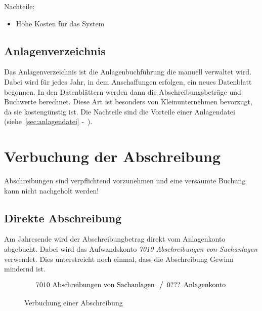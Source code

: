 \documentclass[a4paper,10pt]{report}
\begin{document}
Nachteile:
\begin{itemize}
  \item Hohe Kosten für das System
\end{itemize}

\section{Anlagenverzeichnis}
\label{sec:anlagenverzeichnis}
Das Anlagenverzeichnis ist die Anlagenbuchführung die manuell
verwaltet wird. Dabei wird für jedes Jahr, in dem Anschaffungen
erfolgen, ein neues Datenblatt begonnen. In den Datenblättern werden
dann die Abschreibungsbeträge und Buchwerte berechnet. Diese Art ist
besonders von Kleinunternehmen bevorzugt, da sie kostengünstig
ist. Die Nachteile sind die Vorteile einer Anlagendatei
(siehe~\autoref{sec:anlagendatei} -~).


\chapter{Verbuchung der Abschreibung}
\thispagestyle{fancy}
Abschreibungen sind verpflichtend vorzunehmen und eine versäumte
Buchung kann nicht nachgeholt werden!

\section{Direkte Abschreibung}
\label{sec:direkteabschreibung}
Am Jahresende wird der Abschreibungbetrag direkt vom Anlagenkonto
abgebucht. Dabei wird das Aufwandskonto \textit{7010 Abschreibungen
von Sachanlagen} verwendet. Dies unterstreicht noch einmal, dass die
Abschreibung Gewinn mindernd ist.

\begin{figure}[h]
  \caption{Verbuchung einer Abschreibung}
  \begin{equation*}
    \begin{array}{l}
      \text{7010 Abschreibungen von Sachanlagen}\\
    \end{array}
    \left\slash
      \begin{array}{l}
        \text{0??? Anlagenkonto}\\
      \end{array}
    \right.
  \end{equation*}
  \label{fig:abschreibungsbuchung}
\end{figure}
\end{document}
